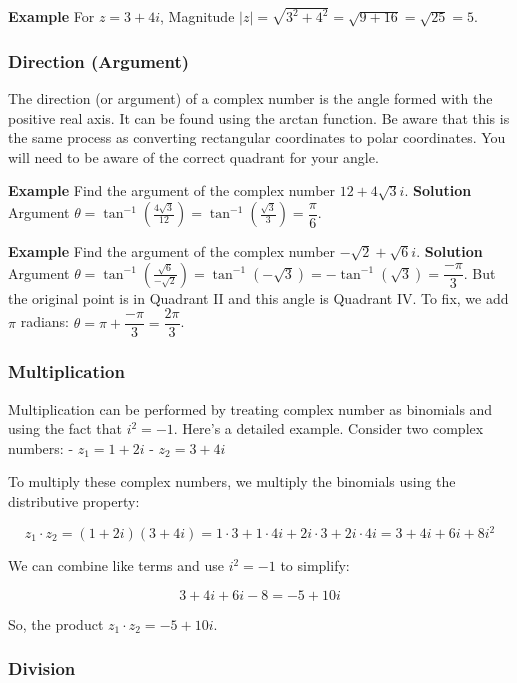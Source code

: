 \documentclass[
]{article}
\begin{document}
\textbf{Example} For \(z = 3 + 4i\), Magnitude
\(|z| = \sqrt{3^2 + 4^2} = \sqrt{9 + 16} = \sqrt{25} = 5\).

\subsubsection{Direction (Argument)}\label{direction-argument}

The direction (or argument) of a complex number is the angle formed with
the positive real axis. It can be found using the arctan function. Be
aware that this is the same process as converting rectangular
coordinates to polar coordinates. You will need to be aware of the
correct quadrant for your angle.

\textbf{Example} Find the argument of the complex number
\(12 + 4\sqrt{3}i\). \textbf{Solution} Argument
\(\theta = \tan^{-1}\left(\frac{4\sqrt{3}}{12}\right) = \tan^{-1}\left(\frac{\sqrt{3}}{3}\right) = \dfrac{\pi}{6}\).

\textbf{Example} Find the argument of the complex number
\(-\sqrt{2}+\sqrt{6}i\). \textbf{Solution} Argument
\(\theta = \tan^{-1}\left(\frac{\sqrt6}{-\sqrt2}\right) = \tan^{-1}\left(-\sqrt3\right) = -\tan^{-1}\left(\sqrt3\right) = \dfrac{-\pi}{3}\).
But the original point is in Quadrant II and this angle is Quadrant IV.
To fix, we add \(\pi\) radians:
\(\theta = \pi + \dfrac{-\pi}{3} = \dfrac{2\pi}{3}\).

\subsubsection{Multiplication}\label{multiplication}

Multiplication can be performed by treating complex number as binomials
and using the fact that \(i^2 = -1\). Here's a detailed example.
Consider two complex numbers: - \(z_1 = 1 + 2i\) - \(z_2 = 3 + 4i\)

To multiply these complex numbers, we multiply the binomials using the
distributive property:

\[
z_1 \cdot z_2 = (1 + 2i)(3 + 4i) = 1\cdot3 + 1\cdot4i + 2i\cdot3 + 2i\cdot4i = 3 + 4i + 6i + 8i^2
\]

We can combine like terms and use \(i^2 = -1\) to simplify:

\[
3 + 4i + 6i - 8 = -5 + 10i
\]

So, the product \(z_1 \cdot z_2 = -5 + 10i\).

\subsubsection{Division}\label{division}
\end{document}
